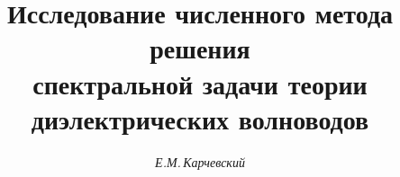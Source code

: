 




% 


\newcommand{\im}{\operatorname{Im}}


\newcommand{\re}{\operatorname{Re}}


\newcommand{\const}{\operatorname{const}}


\newcommand{\tts}[1]{}







 


\setcounter{page}{10}












\author{\it Е.М.\,Карчевский}




\title{Исследование численного метода решения\\


спектральной задачи теории диэлектрических волноводов}





\date{}







\pagestyle{plain} %













